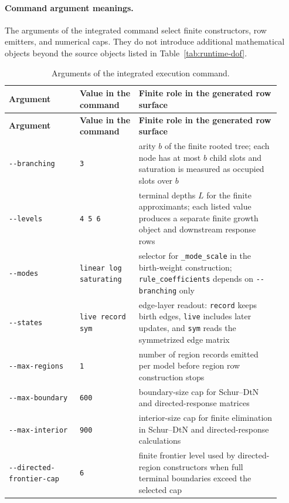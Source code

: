 \documentclass[11pt]{article}
\theoremstyle{remark}
\newcommand{\code}[1]{\texttt{#1}}
\numberwithin{equation}{section}
\begin{document}
\paragraph{Command argument meanings.}
The arguments of the integrated command select finite constructors, row emitters, and numerical caps. They do not introduce additional mathematical objects beyond the source objects listed in Table~\ref{tab:runtime-dof}.
\begin{longtable}{>{\raggedright\arraybackslash}p{0.24\linewidth}>{\raggedright\arraybackslash}p{0.20\linewidth}>{\raggedright\arraybackslash}p{0.48\linewidth}}
\caption{Arguments of the integrated execution command.}\label{tab:integrated-command-arguments}\\
\toprule
\textbf{Argument} & \textbf{Value in the command} & \textbf{Finite role in the generated row surface}\\
\midrule
\endfirsthead
\toprule
\textbf{Argument} & \textbf{Value in the command} & \textbf{Finite role in the generated row surface}\\
\midrule
\endhead
\code{-{}-branching} & \code{3} & arity $b$ of the finite rooted tree; each node has at most $b$ child slots and saturation is measured as occupied slots over $b$\\
\hline
\code{-{}-levels} & \code{4 5 6} & terminal depths $L$ for the finite approximants; each listed value produces a separate finite growth object and downstream response rows\\
\hline
\code{-{}-modes} & \code{linear log saturating} & selector for \code{\_mode\_scale} in the birth-weight construction; \code{rule\_coefficients} depends on \code{-{}-branching} only\\
\hline
\code{-{}-states} & \code{live record sym} & edge-layer readout: \code{record} keeps birth edges, \code{live} includes later updates, and \code{sym} reads the symmetrized edge matrix\\
\hline
\code{-{}-max-\allowbreak{}regions} & \code{1} & number of region records emitted per model before region row construction stops\\
\hline
\code{-{}-max-\allowbreak{}boundary} & \code{600} & boundary-size cap for Schur--DtN and directed-response matrices\\
\hline
\code{-{}-max-\allowbreak{}interior} & \code{900} & interior-size cap for finite elimination in Schur--DtN and directed-response calculations\\
\hline
\code{-{}-directed-\allowbreak{}frontier-\allowbreak{}cap} & \code{6} & finite frontier level used by directed-region constructors when full terminal boundaries exceed the selected cap\\

\end{longtable}
\end{document}
